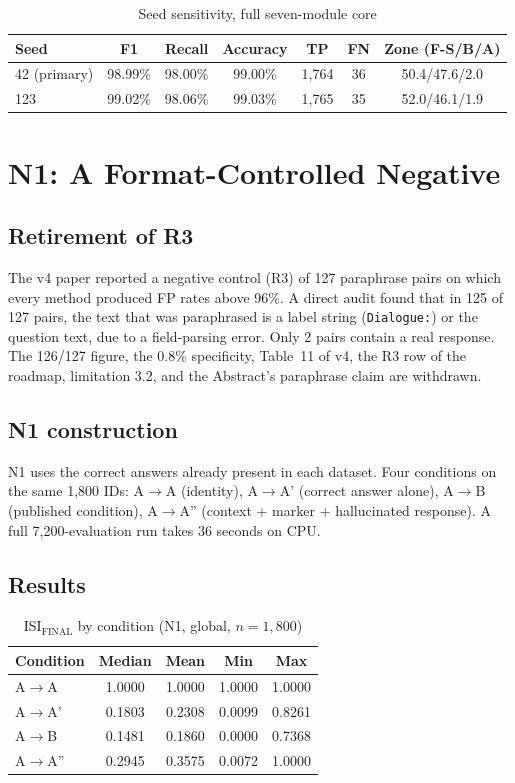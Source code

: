 \documentclass[11pt,a4paper]{article}
\begin{document}
\begin{table}[H]
\centering
\caption{Seed sensitivity, full seven-module core}
\label{tab:seed-audit}
\begin{tabular}{@{}lcccccc@{}}
\toprule
Seed & F1 & Recall & Accuracy & TP & FN & Zone (F-S/B/A) \\
\midrule
42 (primary) & 98.99\% & 98.00\% & 99.00\% & 1,764 & 36 & 50.4/47.6/2.0 \\
123 & 99.02\% & 98.06\% & 99.03\% & 1,765 & 35 & 52.0/46.1/1.9 \\
\bottomrule
\end{tabular}
\end{table}

\section{N1: A Format-Controlled Negative}
\label{sec:n1}

\subsection{Retirement of R3}
The v4 paper reported a negative control (R3) of 127 paraphrase pairs on which every method produced FP rates above 96\%. A direct audit found that in 125 of 127 pairs, the text that was paraphrased is a label string (\texttt{Dialogue:}) or the question text, due to a field-parsing error. Only 2 pairs contain a real response. The 126/127 figure, the 0.8\% specificity, Table~11 of v4, the R3 row of the roadmap, limitation 3.2, and the Abstract's paraphrase claim are withdrawn.

\subsection{N1 construction}
N1 uses the correct answers already present in each dataset. Four conditions on the same 1{,}800 IDs: A$\rightarrow$A (identity), A$\rightarrow$A' (correct answer alone), A$\rightarrow$B (published condition), A$\rightarrow$A'' (context + marker + hallucinated response). A full 7{,}200-evaluation run takes 36 seconds on CPU.

\subsection{Results}

\begin{table}[H]
\centering
\caption{ISI$_{\text{FINAL}}$ by condition (N1, global, $n=1{,}800$)}
\label{tab:n1-isi}
\begin{tabular}{@{}lcccc@{}}
\toprule
Condition & Median & Mean & Min & Max \\
\midrule
A$\rightarrow$A   & 1.0000 & 1.0000 & 1.0000 & 1.0000 \\
A$\rightarrow$A'  & 0.1803 & 0.2308 & 0.0099 & 0.8261 \\
A$\rightarrow$B   & 0.1481 & 0.1860 & 0.0000 & 0.7368 \\
A$\rightarrow$A'' & 0.2945 & 0.3575 & 0.0072 & 1.0000 \\
\bottomrule
\end{tabular}
\end{table}
\end{document}
